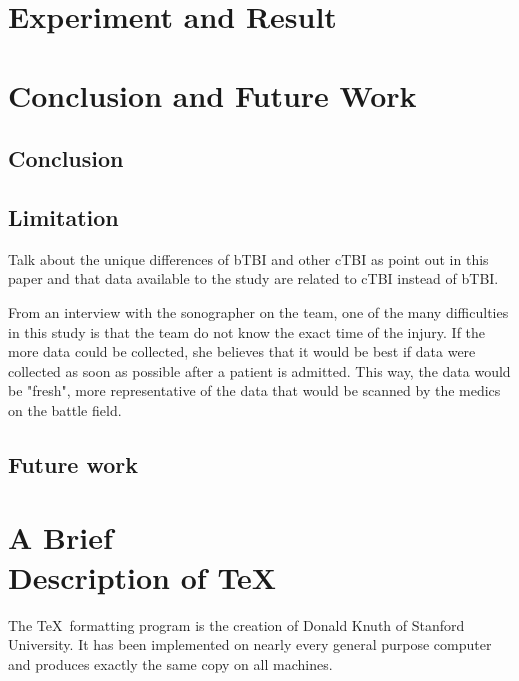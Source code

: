 \documentclass [11pt, proquest] {uwthesis}[2020/02/24]
\begin{document}

\chapter {Experiment and Result}





\chapter {Conclusion and Future Work}

\section{Conclusion}



\section{Limitation}
Talk about the unique differences of bTBI and other cTBI as point out in this 
paper \cite{explosive} and that data available to the study are related to 
cTBI instead of bTBI.

From an interview with the sonographer on the team, one of the many difficulties in this
study is that the team do not know the exact time of the injury. If the more data could be
collected, she believes that it would be best if data were collected as soon as possible after
a patient is admitted. This way, the data would be "fresh", more representative of the data that
would be scanned by the medics on the battle field.


\section{Future work}


 
 
 
\chapter{A Brief \\ Description of \protect\TeX}
 
The \TeX\ formatting program is the creation of
Donald Knuth of Stanford University.
It has been implemented on nearly every general purpose computer and
produces exactly the same copy on all machines.
 
\end{document}
